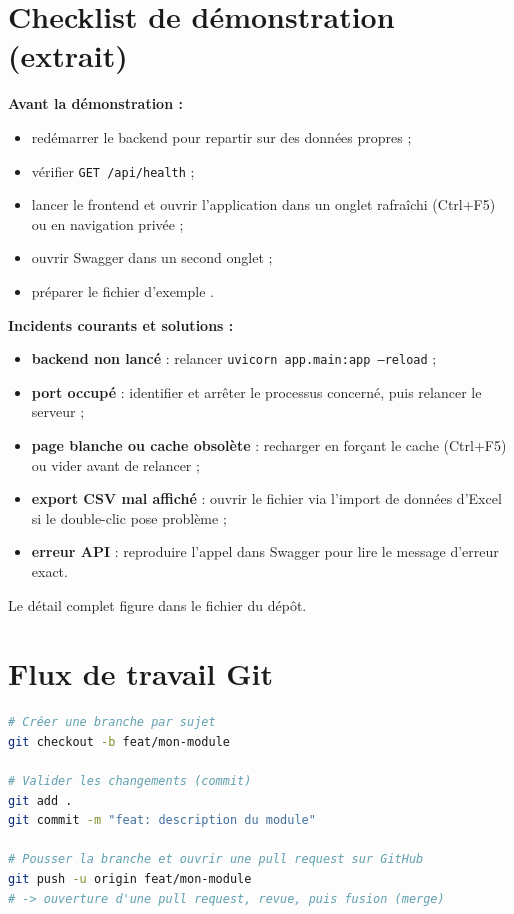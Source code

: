 \section{Checklist de démonstration (extrait)}

\textbf{Avant la démonstration :}
\begin{itemize}
  \item redémarrer le backend pour repartir sur des données propres ;
  \item vérifier \texttt{GET /api/health} ;
  \item lancer le frontend et ouvrir l'application dans un onglet rafraîchi
        (Ctrl+F5) ou en navigation privée ;
  \item ouvrir Swagger dans un second onglet ;
  \item préparer le fichier d'exemple .
\end{itemize}

\textbf{Incidents courants et solutions :}
\begin{itemize}
  \item \textbf{backend non lancé} : relancer
        {\NoAutoSpacing\texttt{uvicorn app.main:app --reload}} ;
  \item \textbf{port occupé} : identifier et arrêter le processus concerné,
        puis relancer le serveur ;
  \item \textbf{page blanche ou cache obsolète} : recharger en forçant le
        cache (Ctrl+F5) ou vider  avant de relancer ;
  \item \textbf{export CSV mal affiché} : ouvrir le fichier via l'import de
        données d'Excel si le double-clic pose problème ;
  \item \textbf{erreur API} : reproduire l'appel dans Swagger pour lire le
        message d'erreur exact.
\end{itemize}

Le détail complet figure dans le fichier
 du dépôt.

\section{Flux de travail Git}

\begin{lstlisting}[language=bash]
# Créer une branche par sujet
git checkout -b feat/mon-module

# Valider les changements (commit)
git add .
git commit -m "feat: description du module"

# Pousser la branche et ouvrir une pull request sur GitHub
git push -u origin feat/mon-module
# -> ouverture d'une pull request, revue, puis fusion (merge)
\end{lstlisting}

